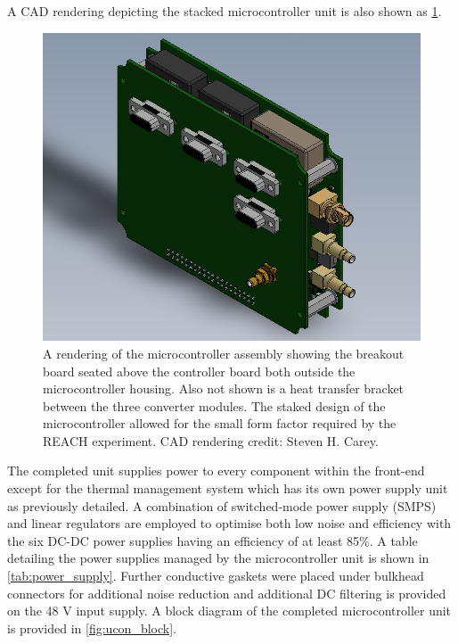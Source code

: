 A CAD rendering depicting the stacked microcontroller unit is also shown as \cref{fig:ucon_cad}.
\begin{figure}
    \centering
    \includegraphics[scale=0.4]{stacked_ucon}
    \caption{A rendering of the microcontroller assembly showing the breakout board seated above the controller board both outside the microcontroller housing. Also not shown is a heat transfer bracket between the three converter modules. The staked design of the microcontroller allowed for the small form factor required by the REACH experiment. CAD rendering credit: Steven H. Carey.}
    \label{fig:ucon_cad}
\end{figure}
The completed unit supplies power to every component within the front-end except for the thermal management system which has its own power supply unit as previously detailed. A combination of switched-mode power supply (SMPS) and linear regulators are employed to optimise both low noise and efficiency with the six DC-DC power supplies having an efficiency of at least 85\%. A table detailing the power supplies managed by the microcontroller unit is shown in \cref{tab:power_supply}. Further conductive gaskets were placed under bulkhead connectors for additional noise reduction and additional DC filtering is provided on the 48 V input supply. A block diagram of the completed microcontroller unit is provided in \cref{fig:ucon_block}.
